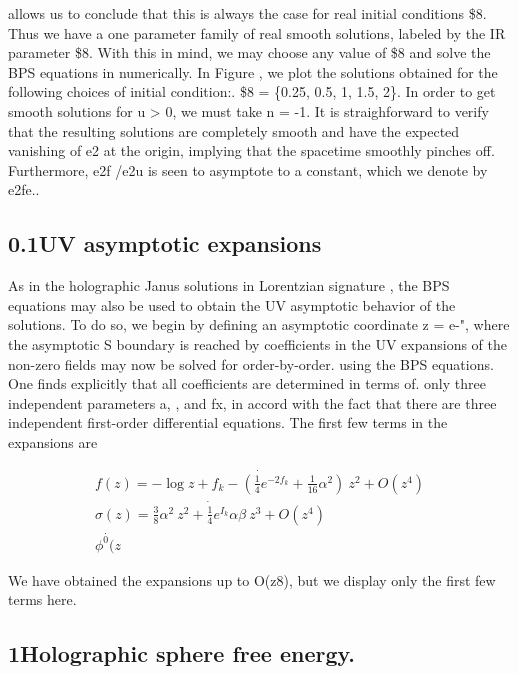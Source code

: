 \documentclass{article}
\begin{document}
\sloppy

allows us to conclude that this is always the case for real initial conditions \$8. Thus we
have a one parameter family of real smooth solutions, labeled by the IR parameter \$8. With
this in mind, we may choose any value of \$8 and solve the BPS equations in numerically.
In Figure , we plot the solutions obtained for the following choices of initial condition:.
\$8 = \{0.25, 0.5, 1, 1.5, 2\}. In order to get smooth solutions for u > 0, we must take n = -1.
It is straighforward to verify that the resulting solutions are completely smooth and have
the expected vanishing of e2 at the origin, implying that the spacetime smoothly pinches
off. Furthermore, e2f /e2u is seen to asymptote to a constant, which we denote by e2fe..


\subsection*{0.1UV asymptotic expansions}


As in the holographic Janus solutions in Lorentzian signature , the BPS equations may also
be used to obtain the UV asymptotic behavior of the solutions. To do so, we begin by
defining an asymptotic coordinate z = e-", where the asymptotic S boundary is reached by
coefficients in the UV expansions of the non-zero fields may now be solved for order-by-order.
using the BPS equations. One finds explicitly that all coefficients are determined in terms of.
only three independent parameters a, , and fx, in accord with the fact that there are three
independent first-order differential equations. The first few terms in the expansions are


\begin{equation}
\begin{array} { c } { \dot { f ( z ) = - \log z + f _ { k } - \left ( \frac { 1 } { 4 } e ^ { - 2 f _ { k } } + \frac { 1 } { 1 6 } \alpha ^ { 2 } \right ) ~ z ^ { 2 } + O ( z ^ { 4 } ) } } \\ { \dot { \sigma ( z ) = \frac { 3 } { 8 } \alpha ^ { 2 } ~ z ^ { 2 } + \frac { 1 } { 4 } e ^ { I _ { k } } \alpha \beta ~ z ^ { 3 } + O ( z ^ { 4 } ) } } \\ { \dot { \phi ^ { 0 } ( z}}\end{array}
\end{equation}


We have obtained the expansions up to O(z8), but we display only the first few terms here.


\subsection*{1Holographic sphere free energy.}
\end{document}

